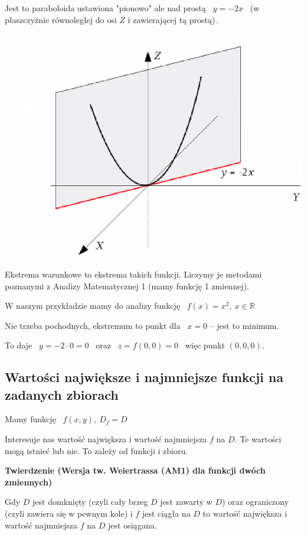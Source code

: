 Jest to paraboloida ustawiona "pionowo" ale nad prostą \ $ y= -2x $ \ (w płaszczyźnie równoległej do osi $Z$ i zawierającej tą prostą).

\begin{center}
\includegraphics[scale=0.5]{img/paraboloida_przyklad.png}
\end{center}

Ekstrema warunkowe to ekstrema takich funkcji. Liczymy je metodami poznanymi z Analizy Matematycznej 1 (mamy funkcję 1 zmiennej).

W naszym przykładzie mamy do analizy funkcję \ $ f(x) = x^2, \ x \in \mathbb{R} $

Nie trzeba pochodnych, ekstremum to punkt dla \ $x = 0$ -- jest to minimum.

To daje \ $ y = -2 \cdot 0 = 0 $ \ oraz \ $ z = f(0,0) = 0 $ \ więc punkt $ (0,0,0) $.

\subsection*{Wartości największe i najmniejsze funkcji na zadanych zbiorach}

Mamy funkcję \ $ f(x,y), \ D_f = D $

Interesuje nas wartość największa i wartość najmniejsza $f$ na $D$. Te wartości mogą istnieć lub nie. To zależy od funkcji i zbioru.
\bigskip

\textbf{Twierdzenie (Wersja tw. Weiertrassa (AM1) dla funkcji dwóch zmiennych)}

Gdy $D$ jest domknięty (czyli cały brzeg $D$ jest zawarty w $D$) oraz ograniczony (czyli zawiera się w pewnym kole) i $f$ jest ciągła
na $D$ to wartość największa i wartość najmniejsza $f$ na $D$ jest osiągana.
\bigskip

